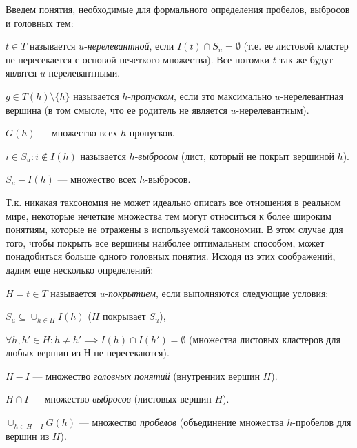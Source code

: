 \documentclass[12pt]{article}
\newenvironment{itemize*}%
{\begin{itemize}%
		\setlength{\itemsep}{0pt}%
		\setlength{\parskip}{0pt}}%
	{\end{itemize}}
\newenvironment{enumerate*}%
{\begin{enumerate}%
		\setlength{\itemsep}{0pt}%
		\setlength{\parskip}{0pt}}%
	{\end{enumerate}}
\begin{document}
Введем понятия, необходимые для формального определения пробелов, выбросов и головных тем: 
\begin{itemize*}
	\item $t\in T$ называется $u$-\textit{нерелевантной}, если $I(t) \cap S_u=\emptyset$ (т.е. ее листовой кластер не пересекается с основой нечеткого множества).
	Все потомки $t$ так же будут являтся $u$-нерелевантными.
	\item $g\in T(h)\setminus\{h\}$ называется $h$-\textit{пропуском}, если это максимально $u$-нерелевантная вершина (в том смысле, что ее родитель не является $u$-нерелевантным). 
	\item $G(h)$ --- множество всех $h$-пропусков.
	\item $i\in S_u: i\notin I(h)$ называется $h$-\textit{выбросом} (лист, который не покрыт вершиной $h$).
	\item $S_u -I(h)$ --- множество всех $h$-выбросов.
\end{itemize*}

Т.к. никакая таксономия не может идеально описать все отношения в реальном мире, некоторые нечеткие множества тем могут относиться к более широким понятиям, которые не отражены в используемой таксономии. В этом случае для того, чтобы покрыть все вершины наиболее оптимальным способом, может понадобиться больше одного головных понятия. Исходя из этих соображений, дадим еще несколько определений:

\begin{itemize*}
	\item $H={t\in T}$ называется $u$-\textit{покрытием}, если выполняются следующие условия:
	\begin{enumerate*}
		\item $S_u\subseteq \cup_{h\in H}I(h)$ ($H$ покрывает $S_u$),
		\item $\forall h, h' \in H: h\neq h' \implies I(h)\cap I(h') = \emptyset$ (множества листовых кластеров для любых вершин из $Н$ не пересекаются).
	\end{enumerate*}
	\item $H-I$ --- множество \textit{головных понятий} (внутренних вершин $H$).
	\item $H\cap I$ --- множество \textit{выбросов} (листовых вершин $H$).
	\item $\cup_{h\in H-I}G(h) $  --- множество \textit{пробелов} (объединение множества $h$-пробелов для вершин из $H$).
\end{itemize*}
\end{document}
